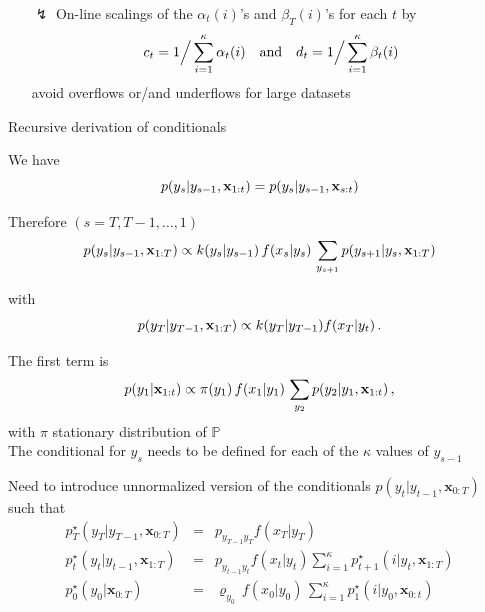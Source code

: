 \begin{slide}
\end{slide}\begin{slide}

\begin{itemize}\item[$\lightning$]
On-line scalings of the $\alpha_t(i)$'s and $ \beta_T(i) $'s for each $t$ by
$$
  c_t = 1 \Big/ \sum_{i=1}^\kappa \alpha_{t}(i) \quad\hbox{and}\quad
  d_t = 1 \Big/ \sum_{i=1}^\kappa \beta_{t}(i) 
$$
avoid overflows or/and underflows for large datasets
\end{itemize}

\end{slide}\begin{slide}[label=Basoo]

Recursive derivation of conditionals

We have
$$
p(y_s|y_{s-1},\mathbf{x}_{1:t})=p(y_s|y_{s-1},\mathbf{x}_{s:t})
$$

Therefore $(s=T,T-1,\ldots,1)$
$$
p(y_s|y_{s-1},\mathbf{x}_{1:T}) \propto k(y_s|y_{s-1})\,f(x_s|y_s)\,
	\sum_{y_{s+1}} p(y_{s+1}|y_s,\mathbf{x}_{1:T})
$$

with 
$$
p(y_T|y_{T-1},\mathbf{x}_{1:T}) \propto k(y_T|y_{T-1}) f(x_T|y_t) \,.
$$

\end{slide}\begin{slide}

The first term is
$$
p(y_1|\mathbf{x}_{1:t}) \propto \pi(y_1)\,f(x_1|y_1)\,\sum_{y_2} p(y_2|y_1,\mathbf{x}_{1:t})\,,
$$
with $\pi$ stationary distribution of ${\mathbb P}$\\

\vs\pause
The conditional for $y_s$ needs to be defined for each of the $\kappa$ values of $y_{s-1}$

\centerline{}

\end{slide}\begin{slide}

Need to introduce unnormalized version of the
conditionals $p(y_t|y_{t-1},\mathbf{x}_{0:T})$ such that
\begin{eqnarray*}
p_T^\star(y_T|y_{T-1},\mathbf{x}_{0:T}) &=& p_{y_{T-1}y_T} f(x_T|y_T)\\
p^\star_{t}(y_t|y_{t-1},\mathbf{x}_{1:T}) &=& p_{y_{t-1}y_t} f(x_t|y_t) 
	\sum_{i=1}^\kappa p^\star_{t+1}(i|y_t,\mathbf{x}_{1:T})\\
p^\star_0(y_0|\mathbf{x}_{0:T}) &=& \varrho_{y_0}\,f(x_0|y_0)\,\sum_{i=1}^\kappa p^\star_1(i|y_0,\mathbf{x}_{0:t})
\end{eqnarray*}


\end{slide}
